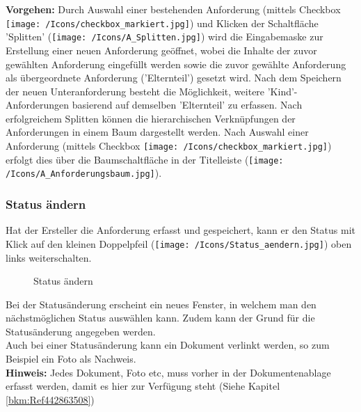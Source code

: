 \textbf{Vorgehen:}
Durch Auswahl einer bestehenden Anforderung (mittels Checkbox \texttt{[image: /Icons/checkbox\_markiert.jpg]}) und Klicken der Schaltfläche 'Splitten'  (\texttt{[image: /Icons/A\_Splitten.jpg]}) wird die Eingabemaske zur Erstellung einer neuen Anforderung geöffnet, wobei die Inhalte der zuvor gewählten Anforderung eingefüllt werden sowie die zuvor gewählte Anforderung als übergeordnete Anforderung ('Elternteil') gesetzt wird. Nach dem Speichern der neuen Unteranforderung besteht die Möglichkeit, weitere 'Kind'-Anforderungen basierend auf demselben 'Elternteil' zu erfassen.
Nach erfolgreichem Splitten können die hierarchischen Verknüpfungen der Anforderungen in einem Baum dargestellt werden. Nach Auswahl einer Anforderung (mittels Checkbox \texttt{[image: /Icons/checkbox\_markiert.jpg]}) erfolgt dies über die Baumschaltfläche in der Titelleiste (\texttt{[image: /Icons/A\_Anforderungsbaum.jpg]}).

\clearpage
\subsubsection{Status ändern}

Hat der Ersteller die Anforderung erfasst und gespeichert, kann er den Status mit Klick auf den kleinen Doppelpfeil (\texttt{[image: /Icons/Status\_aendern.jpg]}) oben links weiterschalten. 

\begin{figure}[H]
\caption{Status ändern}
\end{figure}

Bei der Statusänderung erscheint ein neues Fenster, in welchem man den nächstmöglichen Status auswählen kann. Zudem kann der Grund für die Statusänderung angegeben werden. \\

Auch bei einer Statusänderung kann ein Dokument verlinkt  werden, so zum Beispiel ein Foto als Nachweis.\\
\textbf{Hinweis:} Jedes Dokument, Foto etc, muss vorher in der Dokumentenablage erfasst werden, damit es hier zur Verfügung steht (Siehe Kapitel \ref{bkm:Ref442863508})

